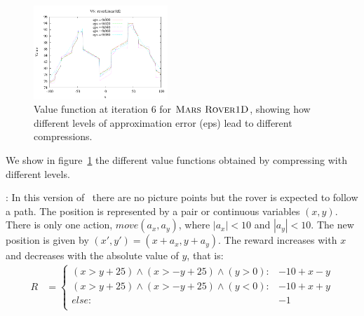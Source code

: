 \begin{figure}[h!]
\center
\includegraphics[width=0.45\textwidth]{Figures/rover1D/roverLinear1d2V6.pdf} 
\caption{Value function at iteration 6 for $\textsc{Mars Rover1D}$, showing how different levels of approximation error (eps) lead to different compressions.}
\label{fig:rover1dv6} 
\end{figure}

We show in figure~\ref{fig:rover1dv6} the different value functions obtained by compressing with different levels.

\MarsRoverBi: In this version of \MarsRover ~there are no picture points but the rover is expected to follow a path. The position is represented by a pair or continuous variables $(x,y)$. There is only one action, $move(a_x,a_y)$, where $|a_x| < 10$ and $|a_y| < 10$. The new position is given by $(x',y') = ( x+a_x, y+a_y)$. The reward increases with $x$ and decreases with the absolute value of $y$, that is:
{\footnotesize
\begin{align*}
R & = \begin{cases}
(x > y +25) \wedge (x > - y  +25) \wedge (y >0): &-10 + x -y\\
(x > y +25) \wedge (x > - y  +25) \wedge (y <0): & -10 + x +y\\
else: & -1\\
\end{cases}
\end{align*}}

